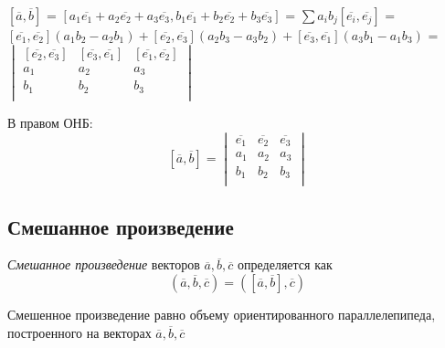 \begin{center}
    $[\overline{a}, \overline{b}]$ = $[a_1\overline{e_1} + a_2\overline{e_2} + a_3\overline{e_3}, b_1\overline{e_1} + b_2\overline{e_2} + b_3\overline{e_3}]$ = $\sum a_i b_j [\overline{e_i}, \overline{e_j}]$ = $[\overline{e_1}, \overline{e_2}](a_1 b_2 - a_2 b_1) + [\overline{e_2}, \overline{e_3}](a_2 b_3 - a_3 b_2) + [\overline{e_3}, \overline{e_1}](a_3 b_1 - a_1 b_3)$ = 
    $\begin{vmatrix}
        [\overline{e_2}, \overline{e_3}] & [\overline{e_3}, \overline{e_1}] & [\overline{e_1}, \overline{e_2}]\\
        a_1 & a_2 & a_3\\
        b_1 & b_2 & b_3\\
    \end{vmatrix}$
\end{center}

В правом ОНБ:
\[
    [\overline{a}, \overline{b}] = 
    \begin{vmatrix}
        \overline{e_1} & \overline{e_2} & \overline{e_3}\\
        a_1 & a_2 & a_3\\
        b_1 & b_2 & b_3\\
    \end{vmatrix}
\]
\subsection{Смешанное произведение}

\begin{definition}
    \textit{Смешанное произведение} векторов $\overline{a}, \overline{b}, \overline{c}$ определяется как 
    \[
    (\overline{a}, \overline{b}, \overline{c}) = ([\overline{a}, \overline{b}], \overline{c})
    \]
\end{definition}

\begin{theorem}
    Смешенное произведение равно объему ориентированного параллелепипеда, построенного на векторах $\overline{a}, \overline{b}, \overline{c}$
\end{theorem}

